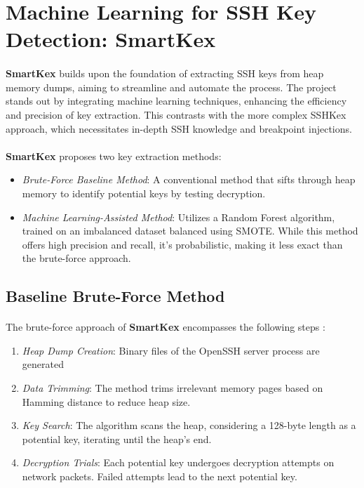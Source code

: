 \section{Machine Learning for SSH Key Detection: SmartKex}\label{sec:related_work:smartkex}

    \paragraph{}\textbf{SmartKex} builds upon the foundation of extracting SSH keys from heap memory dumps, aiming to streamline and automate the process. The project stands out by integrating machine learning techniques, enhancing the efficiency and precision of key extraction. This contrasts with the more complex SSHKex approach, which necessitates in-depth SSH knowledge and breakpoint injections.

    \paragraph{}\textbf{SmartKex} proposes two key extraction methods:
    \begin{itemize}
        \item \textit{Brute-Force Baseline Method}:  A conventional method that sifts through heap memory to identify potential keys by testing decryption.
        \item \textit{Machine Learning-Assisted Method}: Utilizes a Random Forest algorithm, trained on an imbalanced dataset balanced using SMOTE. While this method offers high precision and recall, it's probabilistic, making it less exact than the brute-force approach.
    \end{itemize}

    \subsection{Baseline Brute-Force Method}

    \paragraph{}The brute-force approach of \textbf{SmartKex} encompasses the following steps \cite{fellicious_smartkex_2022}:
    \begin{enumerate}
        \item \textit{Heap Dump Creation}: Binary files of the OpenSSH server process are generated
        \item \textit{Data Trimming}: The method trims irrelevant memory pages based on Hamming distance to reduce heap size.
        \item \textit{Key Search}: The algorithm scans the heap, considering a 128-byte length as a potential key, iterating until the heap's end.
        \item \textit{Decryption Trials}: Each potential key undergoes decryption attempts on network packets. Failed attempts lead to the next potential key.
    \end{enumerate}
